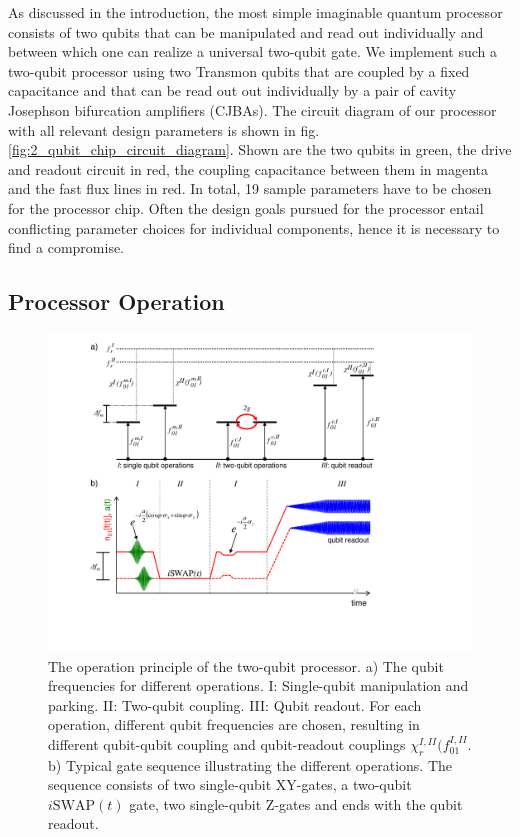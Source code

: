 As discussed in the introduction, the most simple imaginable quantum processor consists of two qubits that can be manipulated and read out individually and between which one can realize a universal two-qubit gate. We implement such a two-qubit processor using two Transmon qubits that are coupled by a fixed capacitance and that can be read out out individually by a pair of cavity Josephson bifurcation amplifiers (CJBAs). The circuit diagram of our processor with all relevant design parameters is shown in fig. \ref{fig:2_qubit_chip_circuit_diagram}. Shown are the two qubits in green, the drive and readout circuit in red, the coupling capacitance between them in magenta and the fast flux lines in red. In total, 19 sample parameters have to be chosen for the processor chip. Often the design goals pursued for the processor entail conflicting parameter choices for individual components, hence it is necessary to find a compromise.

\subsection{Processor Operation}

\begin{figure}[ht!]
	\centering
	\includegraphics[width=\textwidth]{./material/figures/2-qubit-processor/processor_working_principle}
	\caption[...]{The operation principle of the two-qubit processor. a) The qubit frequencies for different operations. I: Single-qubit manipulation and parking. II: Two-qubit coupling. III: Qubit readout. For each operation, different qubit frequencies are chosen, resulting in different qubit-qubit coupling and qubit-readout couplings $\chi_r^{I,II}(f_{01}^{I,II}$. b) Typical gate sequence illustrating the different operations. The sequence consists of two single-qubit XY-gates, a two-qubit $i\mathrm{SWAP}(t)$ gate, two single-qubit Z-gates and ends with the qubit readout.}
	\label{fig:processor_operation}
\end{figure}

